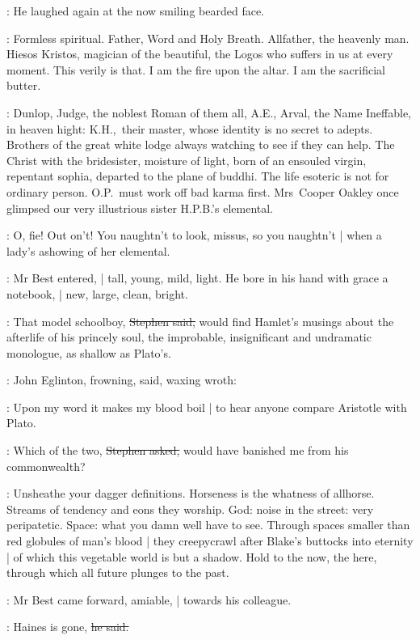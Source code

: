 :
He laughed again
at the now smiling bearded face.

\StephenInt:
Formless spiritual.
Father, Word and Holy Breath.
Allfather, the heavenly man.
Hiesos Kristos, magician of the beautiful,
the Logos who suffers in us at every moment.
This verily is that.
I am the fire upon the altar.
I am the sacrificial butter.

\StephenInt:
Dunlop,
Judge,
the noblest Roman of them all,
A.E.,
Arval,
the Name Ineffable,
in heaven hight:
K.H.,~their master,
whose identity is no secret to adepts.
Brothers of the great white lodge
always watching to see if they can help.
The Christ with the bridesister,
moisture of light,
born of an ensouled virgin,
repentant sophia,
departed to the plane of buddhi.
The life esoteric is not for ordinary person.
O.P.~must work off bad karma first.
Mrs~Cooper Oakley once glimpsed
our very illustrious sister H.P.B.'s elemental.

\StephenInt:
O, fie!
Out on't!
You naughtn't to look, missus,
so you naughtn't |
when a lady's ashowing of her elemental.

:
Mr Best entered, |
tall, young, mild, light.
He bore in his hand with grace a notebook, |
new, large, clean, bright.

\Stephen:
That model schoolboy,
\sout{Stephen said,}
would find Hamlet's musings about the afterlife of his princely soul,
the improbable,
insignificant and undramatic monologue,
as shallow as Plato's.

:
John Eglinton,
frowning, said, waxing wroth:

\eglinton:
Upon my word
it makes my blood boil |
to hear anyone compare Aristotle with Plato.

\Stephen:
Which of the two,
\sout{Stephen asked,}
would have banished me from his commonwealth?

\StephenInt:
Unsheathe your dagger definitions.
Horseness is the whatness of allhorse.
Streams of tendency and eons they worship.
God: noise in the street:
very peripatetic.
Space: what you damn well have to see.
Through spaces smaller than red globules of man's blood |
they creepycrawl after Blake's buttocks into eternity |
of which this vegetable world is but a shadow.
Hold to the now,
the here,
through which all future plunges to the past.

:
Mr Best came forward, amiable, |
towards his colleague.

\best:
Haines is gone,
\sout{he said.}

